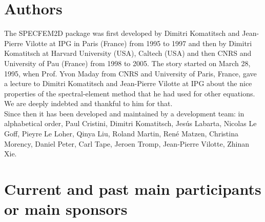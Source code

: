 \documentclass[oneside,english,onecolumn,letterpaper]{book}
\begin{document}
\section*{Authors}
The SPECFEM2D package was first developed by Dimitri Komatitsch and Jean-Pierre Vilotte at IPG in Paris (France) from 1995 to 1997
and then by Dimitri Komatitsch at Harvard University (USA), Caltech (USA) and then CNRS and University of Pau (France) from 1998 to 2005.
The story started on March 28, 1995, when Prof. Yvon Maday from CNRS and University of Paris, France, gave a lecture to
Dimitri Komatitsch and Jean-Pierre Vilotte at IPG about the nice properties of the spectral-element method that he had used for
other equations. We are deeply indebted and thankful to him for that.\\

\noindent
Since then it has been developed and maintained by a development team: in alphabetical order,
Paul Cristini,
Dimitri Komatitsch,
Jes\'us Labarta,
Nicolas Le Goff,
Pieyre Le Loher,
Qinya Liu,
Roland Martin,
Ren\'e Matzen,
Christina Morency,
Daniel Peter,
Carl Tape,
Jeroen Tromp,
Jean-Pierre Vilotte,
Zhinan Xie.

\section*{Current and past main participants or main sponsors}
\end{document}
